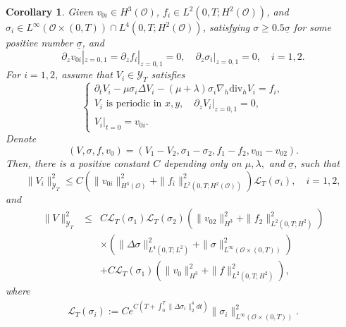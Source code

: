 \documentclass[12pt,reqno]{amsart}
\numberwithin{equation}{section}
\newtheorem{corollary}[theorem]{Corollary}
\begin{document}
\begin{corollary}
  \label{CORA2-2}
  Given $v_{0i}\in H^3(\mathcal O)$, $f_i\in L^2(0,T; H^2(\mathcal O))$, and $\sigma_i\in L^\infty(\mathcal O\times(0,T))\cap L^4(0,T; H^2(\mathcal O))$, satisfying $\sigma\geq0.5\underline\sigma$ for some positive number $\underline\sigma$, and
\begin{equation}\label{BDYIN}
\partial_zv_{0i}|_{z=0,1}=\partial_zf_i|_{z=0,1}=0, \quad \partial_z\sigma_i|_{z=0,1}=0,\quad i=1,2.
\end{equation}
For $i=1,2$, assume that $V_i\in\mathscr{Y}_T$ satisfies
  \begin{equation*}
  \left\{
  \begin{array}{l}
    \partial_tV_i-\mu\sigma_i\Delta V_i-(\mu+\lambda)\sigma_i\nabla_h\text{div}_hV_i=f_i,\\
    V_i \text{ is  periodic in }x,y,\quad \partial_zV_i|_{z=0,1}=0,\\
    V_i|_{t=0}=v_{0i}.
    \end{array}
    \right.
  \end{equation*}
Denote
$$
(V,\sigma,f,v_0)=(V_1-V_2, \sigma_1-\sigma_2, f_1-f_2, v_{01}-v_{02}).
$$
Then, there is a positive constant $C$ depending only on $\mu, \lambda,$ and $\underline\sigma$, such that
\begin{equation*}
\|V_i\|_{\mathscr{Y}_T}^2
 \leq C\left(\|v_{0i}\|_{H^3(\mathcal O)}^2+\|f_i\|_{L^2(0,T;H^2(\mathcal O))}^2\right)\mathcal L_T(\sigma_i),\quad i=1,2,
\end{equation*}
and
\begin{eqnarray*}
\|V\|_{\mathscr Y_T}^2
&\leq& C\mathcal L_T(\sigma_1)\mathcal L_T(\sigma_2)\left(\|v_{02}\|_{H^3}^2+ \|f_2\|_{L^2(0,T;H^2)}^2\right)\\
&&\times \left(\|\Delta\sigma\|_{L^4(0,T;L^2)}^2+\|\sigma\|_{ L^\infty(\mathcal O\times(0,T))}^2\right)\\
  &&+C\mathcal L_T(\sigma_1)\left(\|v_0\|_{H^3}^2+ \|f\|_{L^2(0,T;H^2)}^2\right),
\end{eqnarray*}
where
\begin{eqnarray}
\mathcal L_T(\sigma_i):=Ce^{C\left(T+\int_0^T\|\Delta\sigma_i\|_2^4dt\right)}\|\sigma_i\|_{L^\infty(\mathcal O\times(0,T))}^2. \label{LT}
\end{eqnarray}
\end{corollary}
\end{document}
